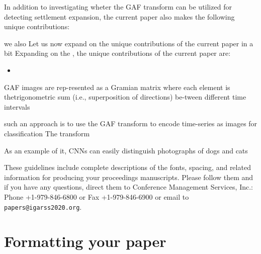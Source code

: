 \documentclass{article}
\begin{document}



In addition to investigating wheter the GAF transform can be utilized for detecting settlement expansion, the current paper also makes the following unique contributions:

we also Let us now expand on the unique contributions of the current paper in a bit Expanding on the , the unique contributions of the current paper are:
\begin{itemize}
 \item 
\end{itemize}




GAF images are rep-resented as a Gramian matrix where each element is thetrigonometric sum (i.e., superposition of directions) be-tween different time intervals


such an approach is to use the GAF transform to encode time-series as images for classification The  transform  



As an example of it, CNNs can easily distinguish photographs of dogs and cats  


These guidelines include complete descriptions of the fonts, spacing, and
related information for producing your proceedings manuscripts. Please follow
them and if you have any questions, direct them to Conference Management
Services, Inc.: Phone +1-979-846-6800 or Fax +1-979-846-6900 or email
to \verb+papers@igarss2020.org+.

\section{Formatting your paper}
\label{sec:format}
\end{document}
